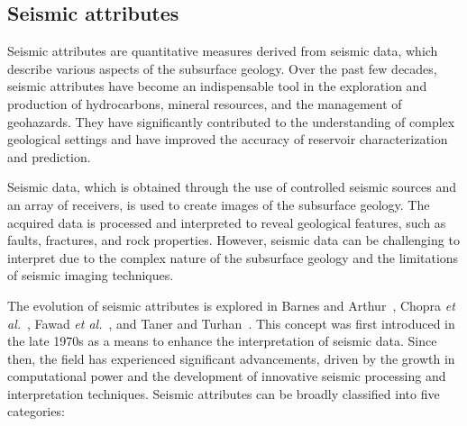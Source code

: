 \subsection{Seismic attributes}
\label{subsec:seismic-attributes}

Seismic attributes are quantitative measures derived from seismic data, which describe various aspects of the subsurface geology.
Over the past few decades, seismic attributes have become an indispensable tool in the exploration and production of hydrocarbons, mineral resources, and the management of geohazards.
They have significantly contributed to the understanding of complex geological settings and have improved the accuracy of reservoir characterization and prediction.

Seismic data, which is obtained through the use of controlled seismic sources and an array of receivers, is used to create images of the subsurface geology.
The acquired data is processed and interpreted to reveal geological features, such as faults, fractures, and rock properties.
However, seismic data can be challenging to interpret due to the complex nature of the subsurface geology and the limitations of seismic imaging techniques.

The evolution of seismic attributes is explored in Barnes and Arthur~\cite{barnes2001seismic}, Chopra \emph{et al.}~\cite{chopra2005seismic}, Fawad \emph{et al.}~\cite{fawad2020seismic}, and Taner and Turhan~\cite{taner2001seismic}.
This concept was first introduced in the late 1970s as a means to enhance the interpretation of seismic data.
Since then, the field has experienced significant advancements, driven by the growth in computational power and the development of innovative seismic processing and interpretation techniques.
Seismic attributes can be broadly classified into five categories:

